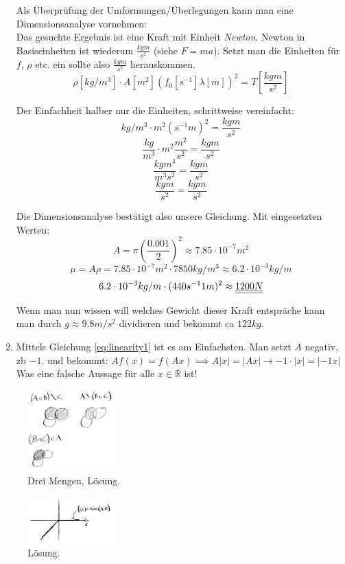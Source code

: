 \begin{enumerate}
Als Überprüfung der Umformungen/Überlegungen kann man eine Dimensionsanalyse vornehmen: \\

Das gesuchte Ergebnis ist eine Kraft mit Einheit \emph{Newton}. Newton in Basiseinheiten ist wiederum $\frac{kgm}{s^2}$ (siehe $F=ma$). Setzt man die Einheiten für $f$, $\rho$ etc. ein sollte also $\frac{kgm}{s^2}$ herauskommen.\\

$$ \rho [kg/m^3] \cdot A[m^2] (f_0[s^{-1}] \lambda [m])^2 = T \left[\frac{kgm}{s^2}\right]$$

Der Einfachheit halber nur die Einheiten, schrittweise vereinfacht:
$$ kg/m^3  \cdot m^2 (s^{-1} m)^2 = \frac{kgm}{s^2}$$
$$ \frac{kg}{m^3}  \cdot m^2  \frac{m^2}{s^2} = \frac{kgm}{s^2}$$
$$ \frac{kg m^4}{m^3 s^2} = \frac{kgm}{s^2}$$
$$ \frac{kg m}{s^2} = \frac{kgm}{s^2}$$

Die Dimensionsanalyse bestätigt also unsere Gleichung. Mit eingesetzten Werten:
$$A = \pi \left(\frac{0.001}{2}\right)^2 \approx 7.85 \cdot 10^{-7} m^2$$
$$ \mu = A\rho = 7.85 \cdot 10^{-7} m^2 \cdot 7850 kg/m^3 \approx 6.2 \cdot10^{-3} kg/m$$
$$ 6.2\cdot10^{-3}kg/m \cdot(440s^{-1} 1m)^2 \approx \underline{\underline{1200 N}}$$

Wenn man nun wissen will welches Gewicht dieser Kraft entspräche kann man durch $g\approx9.8 m/s^2$
 dividieren und bekommt ca $122 kg$.

\item Mittels Gleichung \ref{eq:linearity1} ist es am Einfachsten. Man setzt $A$ negativ, zb $-1$. und bekommt:
$Af(x) = f(Ax) \implies A|x| = |Ax| \to -1\cdot |x| = |-1x|$
Was eine falsche Aussage für alle $x \in \mathbb{R}$ ist!

\end{enumerate}

\begin{figure}[h]
    \centering
    \includegraphics[width=0.3\textwidth]{img/dreiMeingenLoesung.png}
    \caption{Drei Mengen, Lösung. }
    \label{fig:dreiMengenLoes}
\end{figure}

\begin{figure}[h]
    \centering
    \includegraphics[width=0.3\textwidth]{img/loesung_min.png}
    \caption{Lösung. }
    \label{fig:Loes_min}
\end{figure}

